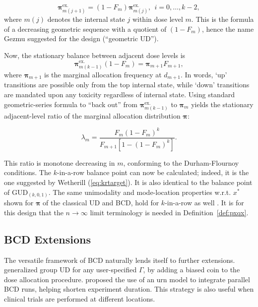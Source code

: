 \begin{equation}\label{eq:kinternal}
\boldsymbol{\pi}^{\textrm{ex.}}_{m(j+1)}=\left(1-F_m\right)\boldsymbol{\pi}^{\textrm{ex.}}_{m(j)},\ \ i=0,\ldots,k-2,
\end{equation}
\noindent where $m(j)$ denotes the internal state $j$ within dose level $m$. This is the formula of a decreasing geometric sequence with a quotient of $\left(1-F_m\right)$, hence the name Gezmu suggested for the design (``geometric UD'').

Now, the stationary balance between adjacent dose levels is
\begin{equation}\label{eq:kexternal}
\boldsymbol{\pi}^{\textrm{ex.}}_{m(k-1)}\left(1-F_m\right)=\boldsymbol{\pi}_{m+1}F_{m+1},
\end{equation}
\noindent where $\boldsymbol{\pi}_{m+1}$ is the marginal allocation frequency at $d_{m+1}$. In words, `up' transitions are possible only from the top internal state, while `down' transitions are mandated upon any toxicity regardless of internal state. Using standard geometric-series formula to ``back out'' from $\boldsymbol{\pi}^{\textrm{ex.}}_{m(k-1)}$ to $\boldsymbol{\pi}_m$ yields the stationary adjacent-level ratio of the marginal allocation distribution $\boldsymbol{\pi}$:

\begin{equation}\label{eq:krgamma}
\lambda_m=\frac{F_m\left(1-F_m\right)^{k}}{F_{m+1}\left[1-\left(1-F_m\right)^{k}\right]}.
\end{equation}

This ratio is monotone decreasing in $m$, conforming to the Durham-Flournoy conditions. The $k$-in-a-row balance point can now be calculated; indeed, it is the one suggested by Wetherill (\ref{eq:krtarget}). It is also identical to the balance point of GUD$_{(k,0,1)}$. The same unimodality and mode-location properties w.r.t. $x^*$ shown for $\boldsymbol{\pi}$ of the classical UD and BCD, hold for $k$-in-a-row as well \citep{Oron:Hoff:thek:2009}. It is for this design that the $n\to\infty$ limit terminology is needed in Definition~\ref{def:pxqx}.

\subsection{BCD Extensions}

The versatile framework of BCD naturally lends itself to further extensions. \cite{Bald:Bort:Giov:2008} generalized group UD for any user-specified $\Gamma$, by adding a biased coin to the dose allocation procedure. \cite{Flou:aran:1998} proposed the use of an urn model to integrate parallel BCD runs, helping shorten experiment duration. This strategy is also useful when clinical trials are performed at different locations.

